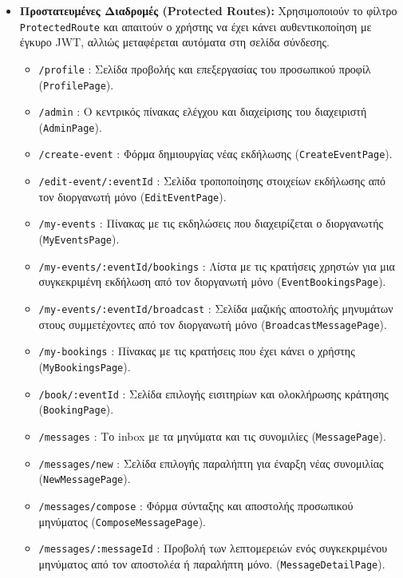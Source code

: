 \documentclass[12pt]{fphw}
\newcommand{\en}[1]{\foreignlanguage{english}{#1}}
\begin{document}
\begin{itemize}[leftmargin=*, itemsep=6pt]
    \item \textbf{Προστατευμένες Διαδρομές (\en{Protected Routes}):} Χρησιμοποιούν το φίλτρο \en{\texttt{ProtectedRoute}} και απαιτούν ο χρήστης να έχει κάνει αυθεντικοποίηση με έγκυρο \en{JWT}, αλλιώς μεταφέρεται αυτόματα στη σελίδα σύνδεσης.
        \begin{itemize}[leftmargin=0.6cm, itemsep=2pt]
            \item \en{\texttt{/profile}} : Σελίδα προβολής και επεξεργασίας του προσωπικού προφίλ (\en{\texttt{ProfilePage}}).
            \item \en{\texttt{/admin}} : Ο κεντρικός πίνακας ελέγχου και διαχείρισης του διαχειριστή (\en{\texttt{AdminPage}}).
            \item \en{\texttt{/create-event}} : Φόρμα δημιουργίας νέας εκδήλωσης (\en{\texttt{CreateEventPage}}).
            \item \en{\texttt{/edit-event/:eventId}} : Σελίδα τροποποίησης στοιχείων εκδήλωσης από τον διοργανωτή μόνο (\en{\texttt{EditEventPage}}).
            \item \en{\texttt{/my-events}} : Πίνακας με τις εκδηλώσεις που διαχειρίζεται ο διοργανωτής (\en{\texttt{MyEventsPage}}).
            \item \en{\texttt{/my-events/:eventId/bookings}} : Λίστα με τις κρατήσεις χρηστών για μια συγκεκριμένη εκδήλωση από τον διοργανωτή μόνο (\en{\texttt{EventBookingsPage}}).
            \item \en{\texttt{/my-events/:eventId/broadcast}} : Σελίδα μαζικής αποστολής μηνυμάτων στους συμμετέχοντες από τον διοργανωτή μόνο (\en{\texttt{BroadcastMessagePage}}).
            \item \en{\texttt{/my-bookings}} : Πίνακας με τις κρατήσεις που έχει κάνει ο χρήστης (\en{\texttt{MyBookingsPage}}).
            \item \en{\texttt{/book/:eventId}} : Σελίδα επιλογής εισιτηρίων και ολοκλήρωσης κράτησης (\en{\texttt{BookingPage}}).
            \item \en{\texttt{/messages}} : Το \en{inbox} με τα μηνύματα και τις συνομιλίες (\en{\texttt{MessagePage}}).
            \item \en{\texttt{/messages/new}} : Σελίδα επιλογής παραλήπτη για έναρξη νέας συνομιλίας (\en{\texttt{NewMessagePage}}).
            \item \en{\texttt{/messages/compose}} : Φόρμα σύνταξης και αποστολής προσωπικού μηνύματος (\en{\texttt{ComposeMessagePage}}).
            \item \en{\texttt{/messages/:messageId}} : Προβολή των λεπτομερειών ενός συγκεκριμένου μηνύματος από τον αποστολέα ή παραλήπτη μόνο. (\en{\texttt{MessageDetailPage}}).
        \end{itemize}
\end{itemize}
\end{document}
